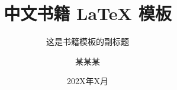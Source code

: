 \documentclass[openany,twoside,zihao=-4]{zhbook}
\title{中文书籍 \LaTeX{} 模板}  %
\subtitle{这是书籍模板的副标题}  %
\author{某某某}  %
\date{202X年X月}  %
\begin{document}
\maketitle

%



\frontmatter





%


%


\maketoc

\makelof

\makelot






\mainmatter



















%







\backmatter  %


\clearpage
\printindex




\end{document}

